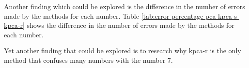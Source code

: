 Another finding which could be explored is the difference in the number of errors made by the methods for each number. Table \ref{tab:error-percentage-pca-kpca-s-kpca-r} shows the difference in the number of errors made by the methods for each number.

Yet another finding that could be explored is to research why \gls{kpca-r} is the only method that confuses many numbers with the number 7.

